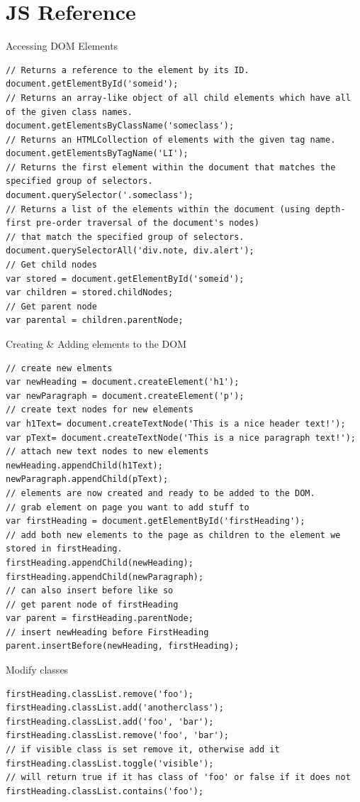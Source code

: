 \documentclass[11pt]{article}
\begin{document}
\section{JS Reference}
\label{sec:org383d796}
Accessing DOM Elements
\begin{verbatim}
// Returns a reference to the element by its ID.
document.getElementById('someid');
// Returns an array-like object of all child elements which have all of the given class names.
document.getElementsByClassName('someclass');
// Returns an HTMLCollection of elements with the given tag name.
document.getElementsByTagName('LI');
// Returns the first element within the document that matches the specified group of selectors.
document.querySelector('.someclass');
// Returns a list of the elements within the document (using depth-first pre-order traversal of the document's nodes)
// that match the specified group of selectors.
document.querySelectorAll('div.note, div.alert');
// Get child nodes
var stored = document.getElementById('someid');
var children = stored.childNodes;
// Get parent node
var parental = children.parentNode;
\end{verbatim}
Creating \& Adding elements to the DOM
\begin{verbatim}
// create new elments
var newHeading = document.createElement('h1');
var newParagraph = document.createElement('p');
// create text nodes for new elements
var h1Text= document.createTextNode('This is a nice header text!');
var pText= document.createTextNode('This is a nice paragraph text!');
// attach new text nodes to new elements
newHeading.appendChild(h1Text);
newParagraph.appendChild(pText);
// elements are now created and ready to be added to the DOM.
// grab element on page you want to add stuff to
var firstHeading = document.getElementById('firstHeading');
// add both new elements to the page as children to the element we stored in firstHeading.
firstHeading.appendChild(newHeading);
firstHeading.appendChild(newParagraph);
// can also insert before like so
// get parent node of firstHeading
var parent = firstHeading.parentNode;
// insert newHeading before FirstHeading
parent.insertBefore(newHeading, firstHeading);
\end{verbatim}
Modify classes
\begin{verbatim}
firstHeading.classList.remove('foo');
firstHeading.classList.add('anotherclass');
firstHeading.classList.add('foo', 'bar');
firstHeading.classList.remove('foo', 'bar');
// if visible class is set remove it, otherwise add it
firstHeading.classList.toggle('visible');
// will return true if it has class of 'foo' or false if it does not
firstHeading.classList.contains('foo');
\end{verbatim}
\end{document}
